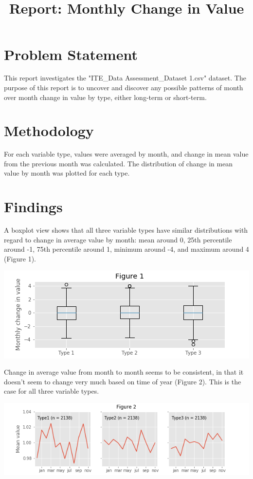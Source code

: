 \documentclass[12pt]{article}
\title{\vspace{-2em}Report: Monthly Change in Value\vspace{-2em}}
\date{}
\begin{document}
\pagecolor{white}

\maketitle

\section{Problem Statement}
This report investigates the "ITE\_Data Assessment\_Dataset 1.csv" dataset. The purpose of this report is to uncover and discover any possible patterns of month over month change in value by type, either long-term or short-term. 

\section{Methodology}
For each variable type, values were averaged by month, and change in mean value from the previous month was calculated. The distribution of change in mean value by month was plotted for each type.

\section{Findings}
A boxplot view shows that all three variable types have similar distributions with regard to change in average value by month: mean around 0, 25th percentile around -1, 75th percentile around 1, minimum around -4, and maximum around 4 (Figure 1).
\\

\begin{center}
\includegraphics{figure.png}
\end{center}
Change in average value from month to month seems to be consistent, in that it doesn't seem to change very much based on time of year (Figure 2). This is the case for all three variable types.

\begin{center}
\includegraphics{subplot_figure.png}
\end{center}
\end{document}
